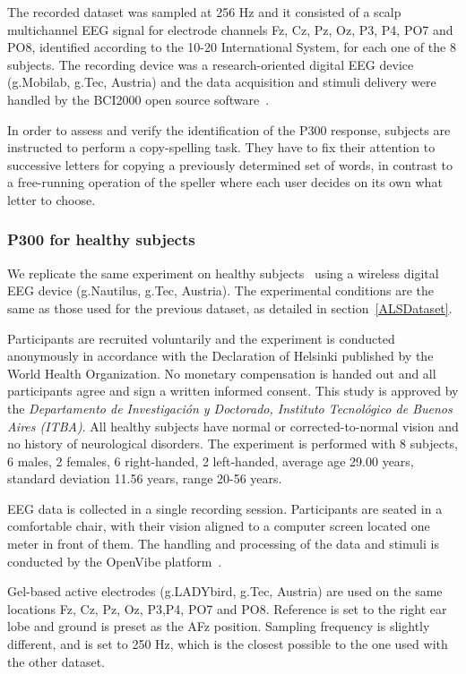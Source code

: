 \documentclass[utf8]{frontiersSCNS} %
\begin{document}
The recorded dataset was sampled at 256 Hz and it consisted of a scalp multichannel EEG signal for electrode channels Fz, Cz, Pz, Oz, P3, P4, PO7 and PO8, identified according to the 10-20 International System,  for each one of the 8 subjects.   The recording device was a research-oriented digital EEG device (g.Mobilab, g.Tec, Austria) and the data acquisition and stimuli delivery were handled by the BCI2000 open source software~\citep{Schalk2004}.

In order to assess and verify the identification of the P300 response, subjects are instructed to perform a copy-spelling task. They have to fix their attention to successive letters for copying a previously determined set of words, in contrast to a free-running operation of the speller where each user decides on its own what letter to choose.

\subsubsection{P300 for healthy subjects}

We replicate the same experiment on healthy subjects~\citep{owndataset} using a wireless digital EEG device (g.Nautilus, g.Tec, Austria).  The experimental conditions are the same as those used for the previous dataset, as detailed in section~\ref{ALSDataset}.

Participants are recruited voluntarily and the experiment is conducted anonymously in accordance with the Declaration of Helsinki published by the World Health Organization.  No monetary compensation is handed out and all participants agree and sign a written informed consent.  This study is approved by the \textit{Departamento de Investigación y Doctorado, Instituto Tecnológico de Buenos Aires (ITBA)}.  All healthy subjects have normal or corrected-to-normal vision and no history of neurological disorders. The experiment is performed with 8 subjects, 6 males, 2 females, 6 right-handed, 2 left-handed, average age 29.00 years, standard deviation  11.56 years, range 20-56 years.

EEG data is collected in a single recording session. Participants are seated in a comfortable chair, with their vision aligned to a computer screen located one meter in front of them.  The handling and processing of the data and stimuli is conducted by the OpenVibe platform~\citep{Renard2010}. 

Gel-based active electrodes (g.LADYbird, g.Tec, Austria) are used on the same locations Fz, Cz, Pz, Oz, P3,P4, PO7 and PO8.  Reference is set to the right ear lobe and ground is preset as the AFz position.   Sampling frequency is slightly different, and is set to 250 Hz, which is the closest possible to the one used with the other dataset.
\end{document}
